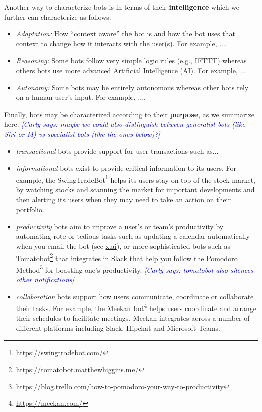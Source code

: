 \documentclass{sig-alternate}
\newcommand{\cl}[1]{\textcolor{blue}{{\it [Carly says: #1]}}}
\begin{document}
Another way to characterize bots is in terms of their \textbf{intelligence} which we further can characterize as follows:
\begin{itemize}
\item \emph{Adaptation:} How ``context aware'' the bot is and how the bot uses that context to change how it interacts with the user(s).  For example, ....
\item \emph{Reasoning:} Some bots follow very simple logic rules (e.g., IFTTT) whereas others bots use more advanced Artificial Intelligence (AI).  For example, ...
\item \emph{Autonomy:}  Some bots may be entirely autonomous whereas other bots rely on a human user's input.  For example, ....
\end{itemize}



Finally, bots may be characterized according to their \textbf{purpose}, as we summarize here: 
\cl{maybe we could also distinguish between generalist bots (like Siri or M) vs specialist bots (like the ones below)?}
\begin{itemize}
\item \emph{transactional} bots provide support for user transactions such as...
\item \emph{informational} bots exist to provide critical information to its users.  For example, the SwingTradeBot\footnote{\url{https://swingtradebot.com/}} helps its users stay on top of the stock market, by watching stocks and scanning the market for important developments and then alerting its users when they may need to take an action on their portfolio. 
\item \emph{productivity} bots aim to improve a user's or team's productivity by automating rote or tedious tasks such as updating a calendar automatically when you email the bot (see \url{x.ai}), or more sophisticated bots such as Tomatobot\footnote{\url{https://tomatobot.matthewhiggins.me/}} that integrates in Slack that help you follow the Pomodoro Method\footnote{\url{https://blog.trello.com/how-to-pomodoro-your-way-to-productivity}} for boosting one's productivity. \cl{tomatobot also silences other notifications}
\item \emph{collaboration} bots support how users communicate, coordinate or collaborate their tasks.  For example, the Meekan bot\footnote{\url{https://meekan.com/}} helps users coordinate and arrange their schedules to facilitate meetings.  Meekan integrates across a number of different platforms including Slack, Hipchat and Microsoft Teams.
\end{itemize}
	
\end{document}
